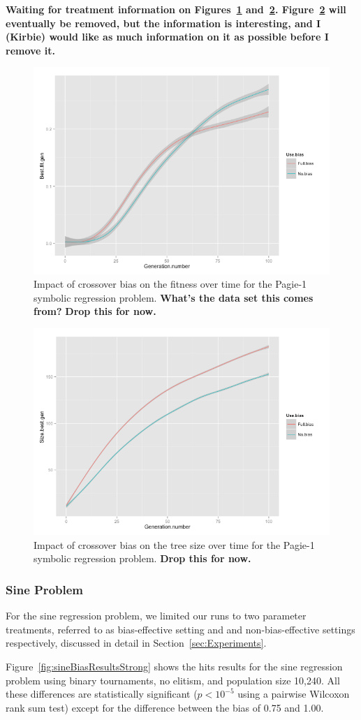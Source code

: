 \documentclass{sig-alternate}
\begin{document}
\textbf{Waiting for treatment information on Figures~\ref{fig:Pagie1FitnessOverTime} and~\ref{fig:Pagie1SizeOverTime}.
Figure~\ref{fig:Pagie1SizeOverTime} will eventually be removed, but the information is interesting, and I (Kirbie)
would like as much information on it as possible before I remove it.}

\begin{figure}
\centering
\includegraphics[width=0.45 \textwidth]{Plots/Pagie-1_fitness_vs_time.png}
\caption{Impact of crossover bias on the fitness over time for the Pagie-1 symbolic regression problem. \textbf{What's the data set this comes from?} \textbf{Drop this for now.}}
\label{fig:Pagie1FitnessOverTime}
\end{figure}

\begin{figure}
\centering
\includegraphics[width=0.45 \textwidth]{Plots/Pagie-1_size_vs_time.png}
\caption{Impact of crossover bias on the tree size over time for the Pagie-1 symbolic regression problem. \textbf{Drop this for now.}}
\label{fig:Pagie1SizeOverTime}
\end{figure}

\subsubsection{Sine Problem}

For the sine regression problem, we limited our runs to two parameter treatments, referred to as bias-effective setting
and and non-bias-effective settings respectively, discussed in detail in Section~\ref{sec:Experiments}.

Figure~\ref{fig:sineBiasResultsStrong} shows the hits results for the sine regression problem using binary tournaments,
no elitism, and population size 10,240. All these differences are statistically significant ($p < 10^{-5}$ using a
pairwise Wilcoxon rank sum test) except for the difference between the bias of 0.75 and 1.00.
\end{document}
